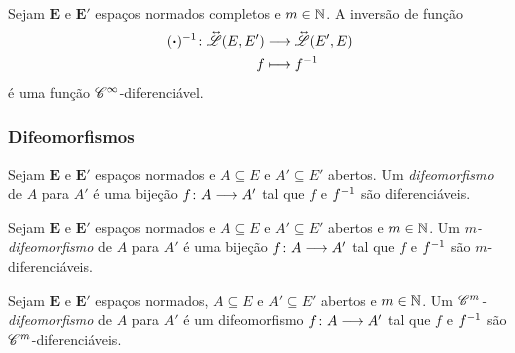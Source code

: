 \begin{proposition}
\label{prop:suavidade.inversao.funcao}
Sejam $\bm E$ e $\bm E'$ espaços normados completos e $m \in \mathbb{N}$. A inversão de função
	\begin{align*}
	{(\bm{\cdot})^{-1}}\colon {\accentset{\leftrightarrow\ }{\mathscr{L}}(E,E')} &\longrightarrow {\accentset{\leftrightarrow\ }{\mathscr{L}}(E',E)} \\{f} &\longmapsto f^{-1}
	\end{align*}
é uma função $\mathscr{C}^\infty$-diferenciável.
\end{proposition}

\subsubsection{Difeomorfismos}

\begin{definition}[Difeomorfismo]
Sejam $\bm E$ e $\bm E'$ espaços normados e $A \subseteq E$ e $A' \subseteq E'$ abertos. Um \emph{difeomorfismo} de $A$ para $A'$ é uma bijeção $f\colon \allowbreak A \longrightarrow A'$ tal que $f$ e $f^{-1}$ são diferenciáveis.
\end{definition}

\begin{definition}[Multidifeomorfismo]
Sejam $\bm E$ e $\bm E'$ espaços normados e $A \subseteq E$ e $A' \subseteq E'$ abertos e $m \in \mathbb{N}$. Um \emph{$m$-difeomorfismo} de $A$ para $A'$ é uma bijeção $f\colon \allowbreak A \longrightarrow A'$ tal que $f$ e $f^{-1}$ são $m$-diferenciáveis.
\end{definition}

\begin{definition}
Sejam $\bm E$ e $\bm E'$ espaços normados, $A \subseteq E$ e $A' \subseteq E'$ abertos e $m \in \mathbb{N}$. Um \emph{$\mathscr{C}^m$-difeomorfismo} de $A$ para $A'$ é um difeomorfismo $f\colon \allowbreak A \longrightarrow A'$ tal que $f$ e $f^{-1}$ são $\mathscr{C}^m$-diferenciáveis.
\end{definition}

